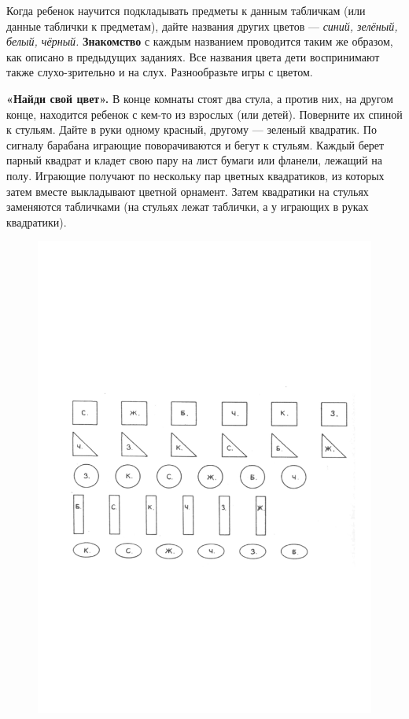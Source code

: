\documentclass[a5paper]{book}
\renewcommand{\emph}[1]{\textit{#1}}
\begin{document}
Когда ребенок научится подкладывать предметы к данным табличкам (или
данные таблички к предметам), дайте названия других цветов ---
\emph{синий, зелёный, белый, чёрный.} \textbf{Знакомство} с каждым
названием проводится таким же образом, как описано в предыдущих
заданиях. Все названия цвета дети воспринимают также слухо-зрительно и
на слух. Разнообразьте игры с цветом.

\textbf{«Найди свой цвет».} В конце комнаты стоят два стула, а против
них, на другом конце, находится ребенок с кем-то из взрослых (или
детей). Поверните их спиной к стульям. Дайте в руки одному красный,
другому --- зеленый квадратик. По сигналу барабана играющие
поворачиваются и бегут к стульям. Каждый берет парный квадрат и кладет
свою пару на лист бумаги или фланели, лежащий на полу. Играющие получают
по нескольку пар цветных квадратиков, из которых затем вместе
выкладывают цветной орнамент. Затем квадратики на стульях заменяются
табличками (на стульях лежат таблички, а у играющих в руках квадратики).

\begin{figure}
\centering
\includegraphics[width=\linewidth]{media/media/image17.png}
\end{figure}
\end{document}
